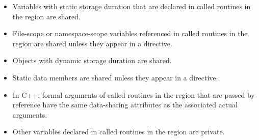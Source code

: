 \begin{ccppspecific}
\begin{itemize}
\item Variables with static storage duration that are declared in called routines in the region
are shared.

\item File-scope or namespace-scope variables referenced in called routines in the region
are shared unless they appear in a  directive.

\item Objects with dynamic storage duration are shared.

\item Static data members are shared unless they appear in a  directive.

\item In C++, formal arguments of called routines in the region that are passed by reference have the same data-sharing attributes as the associated actual arguments.

\item Other variables declared in called routines in the region are private.
\end{itemize}
\end{ccppspecific}
%
